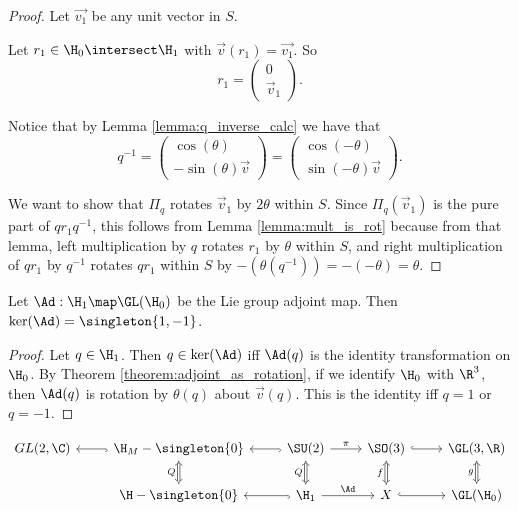 \documentclass[oneside,12pt]{amsart}
\begin{document}
\begin{proof}
Let $\vec{v_1}$ be any unit vector in $S$.  

Let $r_1\in\H_0\intersect\H_1$ with
$\vec{v}(r_1)=\vec{v_1}$. So
$$r_1 = \begin{pmatrix} 0 \\ \vec{v}_1 \end{pmatrix}.$$

Notice that by Lemma \ref{lemma:q_inverse_calc} we have that
$$q^{-1} = \begin{pmatrix} \cos(\theta) \\ -\sin(\theta) \vec{v} \end{pmatrix}
= \begin{pmatrix} \cos(-\theta) \\ \sin(-\theta) \vec{v} \end{pmatrix}.$$


We want to show that $\Pi_q$ rotates $\vec{v}_1$ by $2\theta$ within $S$.
Since $\Pi_q(\vec{v}_1)$ is the pure part of $q r_1 q^{-1}$, this follows from 
Lemma \ref{lemma:mult_is_rot} because from that lemma, left multiplication by $q$
rotates $r_1$ by $\theta$ within $S$, and right multiplication of $q r_1$ by $q^{-1}$ rotates $q r_1$ within $S$ by
$-(\theta(q^{-1})) = -(-\theta) = \theta$.
\end{proof}

\begin{corollary}
Let $\Ad:\H_1 \map \GL(\H_0)$ be the Lie group adjoint map. Then $\ker(\Ad) = \singleton{1,-1}$.
\end{corollary}
\begin{proof}
Let $q\in\H_1$. Then $q\in\ker(\Ad)$ iff $\Ad(q)$ is the identity transformation on $\H_0$. By Theorem 
\ref{theorem:adjoint_as_rotation},
if we identify $\H_0$ with $\R^3$, then $\Ad(q)$ is rotation by $\theta(q)$ about $\vec{v}(q)$. This
is the identity iff $q=1$ or $q=-1$.
\end{proof}

$$
\begin{tikzcd}
   GL(2,\C) & \H_M - \singleton{0} \arrow[l, hook] \arrow[d,Leftrightarrow,"Q"'] & \SU(2) \arrow[l, hook] \arrow[r, "\pi"] \arrow[d,Leftrightarrow,"Q"'] & \SO(3) \arrow[d,Leftrightarrow,"f"'] \arrow[r, hook] & \GL(3,\R)  \arrow[d,Leftrightarrow,"g"'] \\
 & \H - \singleton{0}   &  \H_1 \arrow[l, hook] \arrow[r, "\Ad"] & X  \arrow[r, hook] & \GL(\H_0) 
\end{tikzcd}
$$





\end{document}
